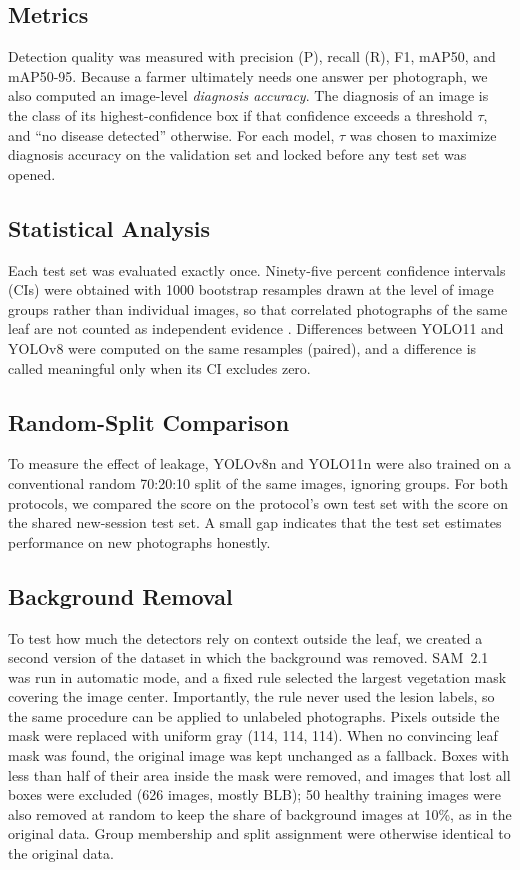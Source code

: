 \documentclass[conference]{IEEEtran}
\begin{document}
\subsection{Metrics}
Detection quality was measured with precision (P), recall (R), F1, mAP50, and mAP50-95. Because a farmer ultimately needs one answer per photograph, we also computed an image-level \emph{diagnosis accuracy}. The diagnosis of an image is the class of its highest-confidence box if that confidence exceeds a threshold $\tau$, and ``no disease detected'' otherwise. For each model, $\tau$ was chosen to maximize diagnosis accuracy on the validation set and locked before any test set was opened.

\subsection{Statistical Analysis}
Each test set was evaluated exactly once. Ninety-five percent confidence intervals (CIs) were obtained with 1000 bootstrap resamples drawn at the level of image groups rather than individual images, so that correlated photographs of the same leaf are not counted as independent evidence \cite{efron1993}. Differences between YOLO11 and YOLOv8 were computed on the same resamples (paired), and a difference is called meaningful only when its CI excludes zero.

\subsection{Random-Split Comparison}
To measure the effect of leakage, YOLOv8n and YOLO11n were also trained on a conventional random 70:20:10 split of the same images, ignoring groups. For both protocols, we compared the score on the protocol's own test set with the score on the shared new-session test set. A small gap indicates that the test set estimates performance on new photographs honestly.

\subsection{Background Removal}
To test how much the detectors rely on context outside the leaf, we created a second version of the dataset in which the background was removed. SAM~2.1 \cite{ravi2024} was run in automatic mode, and a fixed rule selected the largest vegetation mask covering the image center. Importantly, the rule never used the lesion labels, so the same procedure can be applied to unlabeled photographs. Pixels outside the mask were replaced with uniform gray (114, 114, 114). When no convincing leaf mask was found, the original image was kept unchanged as a fallback. Boxes with less than half of their area inside the mask were removed, and images that lost all boxes were excluded (626 images, mostly BLB); 50 healthy training images were also removed at random to keep the share of background images at 10\%, as in the original data. Group membership and split assignment were otherwise identical to the original data.
\end{document}
